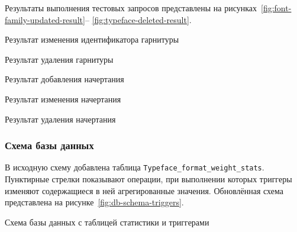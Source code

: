Результаты выполнения тестовых запросов представлены на
рисунках~\ref{fig:font-family-updated-result}--
\ref{fig:typeface-deleted-result}.

{Результат изменения идентификатора гарнитуры}
{\label{fig:font-family-updated-result}}

{Результат удаления гарнитуры}
{\label{fig:font-family-deleted-result}}

{Результат добавления начертания}
{\label{fig:typeface-inserted-result}}

{Результат изменения начертания}
{\label{fig:typeface-updated-result}}

{Результат удаления начертания}
{\label{fig:typeface-deleted-result}}

\subsubsection{Схема базы данных}

В исходную схему добавлена таблица
\texttt{Typeface_format_weight_stats}. Пунктирные стрелки показывают
операции, при выполнении которых триггеры изменяют содержащиеся в ней
агрегированные значения. Обновлённая схема представлена на
рисунке~\ref{fig:db-schema-triggers}.

{Схема базы данных с таблицей статистики и триггерами}
{\label{fig:db-schema-triggers}}
